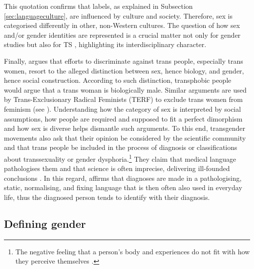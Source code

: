 This quotation confirms that labels, as explained in Subsection \ref{sec:languageculture}, are influenced by culture and society. Therefore, sex is categorised differently in other, non-Western cultures. The question of how sex and/or gender identities are represented is a crucial matter not only for gender studies but also for TS \citep{spurlin2014gender}, highlighting its interdisciplinary character.


Finally, \textcite{serano2017transgender} argues that efforts to discriminate against trans people, especially trans women, resort to the alleged distinction between sex, hence biology, and gender, hence social construction. According to such distinction, transphobic people would argue that a trans woman is biologically male. Similar arguments are used by Trans-Exclusionary Radical Feminists (TERF) to exclude trans women from feminism (see \cite{lester2018trans}). Understanding how the category of sex is interpreted by social assumptions, how people are required and supposed to fit a perfect dimorphism and how sex is diverse helps dismantle such arguments. To this end, transgender movements also ask that their opinion be considered by the scientific community and that trans people be included in the process of diagnosis or classifications about transsexuality or gender dysphoria.\footnote{The negative feeling that a person's body and experiences do not fit with how they perceive themselves \citep[65]{barker2019life}.} They claim that medical language pathologises them and that science is often imprecise, delivering ill-founded conclusions \citep{sterling2020science}. In this regard, \textcite[76--77]{acanfora2021in} affirms that diagnoses are made in a pathologising, static, normalising, and fixing language that is then often also used in everyday life, thus the diagnosed person tends to identify with their diagnosis. 


\subsection{Defining gender} \label{Gender}

